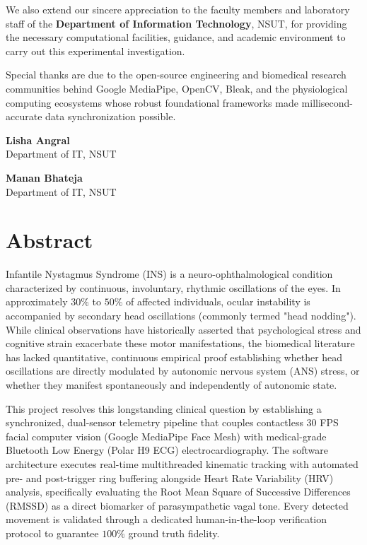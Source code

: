 \documentclass[12pt,a4paper,oneside]{report}
\begin{document}
\vspace{0.4cm}
\noindent We also extend our sincere appreciation to the faculty members and laboratory staff of the \textbf{Department of Information Technology}, NSUT, for providing the necessary computational facilities, guidance, and academic environment to carry out this experimental investigation.

\vspace{0.4cm}
\noindent Special thanks are due to the open-source engineering and biomedical research communities behind Google MediaPipe, OpenCV, Bleak, and the physiological computing ecosystems whose robust foundational frameworks made millisecond-accurate data synchronization possible.

\vspace{1.2cm}
\noindent
\begin{minipage}[t]{0.45\textwidth}
    \textbf{Lisha Angral}\\
    Department of IT, NSUT
\end{minipage}
\hfill
\begin{minipage}[t]{0.45\textwidth}
    \flushright
    \textbf{Manan Bhateja}\\
    Department of IT, NSUT
\end{minipage}

\cleardoublepage
{}
\setcounter{page}{1}
\chapter*{Abstract}

Infantile Nystagmus Syndrome (INS) is a neuro-ophthalmological condition characterized by continuous, involuntary, rhythmic oscillations of the eyes. In approximately $30\%$ to $50\%$ of affected individuals, ocular instability is accompanied by secondary head oscillations (commonly termed "head nodding"). While clinical observations have historically asserted that psychological stress and cognitive strain exacerbate these motor manifestations, the biomedical literature has lacked quantitative, continuous empirical proof establishing whether head oscillations are directly modulated by autonomic nervous system (ANS) stress, or whether they manifest spontaneously and independently of autonomic state.

This project resolves this longstanding clinical question by establishing a synchronized, dual-sensor telemetry pipeline that couples contactless 30 FPS facial computer vision (Google MediaPipe Face Mesh) with medical-grade Bluetooth Low Energy (Polar H9 ECG) electrocardiography. The software architecture executes real-time multithreaded kinematic tracking with automated pre- and post-trigger ring buffering alongside Heart Rate Variability (HRV) analysis, specifically evaluating the Root Mean Square of Successive Differences (RMSSD) as a direct biomarker of parasympathetic vagal tone. Every detected movement is validated through a dedicated human-in-the-loop verification protocol to guarantee $100\%$ ground truth fidelity.
\end{document}
